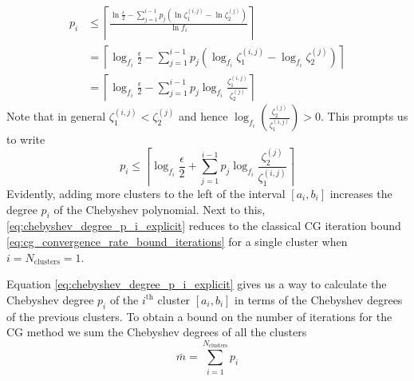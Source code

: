 \begin{align*}
    p_i &\leq \left\lceil\frac{\ln{\frac{\epsilon}{2}} - \sum_{j=1}^{i-1} p_j\left(\ln{\zeta^{(i,j)}_1} - \ln{\zeta^{(j)}_2} \right)}{\ln{f_i}}\right\rceil \\
    &= \left\lceil\log_{f_i}{\frac{\epsilon}{2}} - \sum_{j=1}^{i-1} p_j\left(\log_{f_i}{\zeta^{(i,j)}_1} - \log_{f_i}{\zeta^{(j)}_2} \right)\right\rceil\\
    &= \left\lceil\log_{f_i}{\frac{\epsilon}{2}} - \sum_{j=1}^{i-1} p_j\log_{f_i}{\frac{\zeta^{(i,j)}_1}{\zeta^{(j)}_2}} \right\rceil
\end{align*}
Note that in general $\zeta^{(i,j)}_1 < \zeta^{(j)}_2$ and hence $\log_{f_i}{\left(\frac{\zeta^{(j)}_2}{\zeta^{(i,j)}_1}\right)} > 0$. This prompts us to write
\begin{equation}
    p_i \leq \left\lceil\log_{f_i}{\frac{\epsilon}{2}} + \sum_{j=1}^{i-1} p_j\log_{f_i}{\frac{\zeta^{(j)}_2}{\zeta^{(i,j)}_1}} \right\rceil
    \label{eq:chebyshev_degree_p_i_explicit}
\end{equation}
Evidently, adding more clusters to the left of the interval $[a_i,b_i]$ increases the degree $p_i$ of the Chebyshev polynomial. Next to this, \cref{eq:chebyshev_degree_p_i_explicit} reduces to the classical CG iteration bound \cref{eq:cg_convergence_rate_bound_iterations} for a single cluster when $i = N_{\text{clusters}} = 1$.

Equation \ref{eq:chebyshev_degree_p_i_explicit} gives us a way to calculate the Chebyshev degree $p_i$ of the $i^{\text{th}}$ cluster $[a_i,b_i]$ in terms of the Chebyshev degrees of the previous clusters. To obtain a bound on the number of iterations for the CG method we sum the Chebyshev degrees of all the clusters
\begin{equation}
    \bar{m} = \sum_{i=1}^{N_{\text{clusters}}} p_i
    \label{eq:cg_iteration_bound_multiple_clusters}
\end{equation}